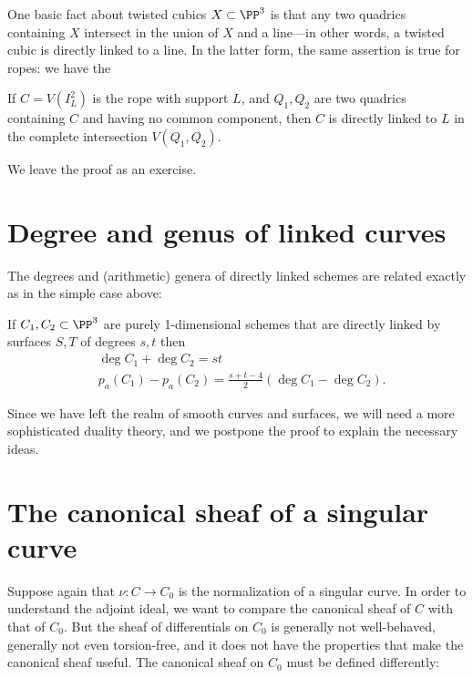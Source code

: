 One basic fact about twisted cubics $X \subset \PP^3$ is that any two quadrics containing $X$ intersect in the union of $X$ and a line---in other words, a twisted cubic is directly linked to a line. In the latter form, the same assertion is true for ropes: we have the

\begin{proposition}
If $C = V(I_L^2)$ is the rope with support $L$, and $Q_1, Q_2$ are two quadrics containing $C$ and having no common component, then $C$ is directly linked to $L$ in the complete intersection $V(Q_1,Q_2)$.
\end{proposition}

We leave the proof as an exercise.

\section{Degree and genus of linked curves}

The degrees and (arithmetic) genera 
of directly linked schemes are related exactly as in the simple case above:

\begin{theorem}\label{direct linkage}\label{linked genus formula}
If $C_1,{C_2}\subset \PP^3$ are purely 1-dimensional schemes that are directly linked by surfaces $S,T$ of degrees $s,t$  then 
$$
\begin{aligned}
&\deg C_1+\deg C_2 = st\\
&p_a(C_1) - p_a({C_2}) = \frac{s+t-4}{2}(\deg C_1-\deg {C_2}).
\end{aligned}
 $$
\end{theorem}

Since we have left the realm of smooth curves and surfaces, we will need a more sophisticated duality theory, and we
postpone the proof to explain the necessary ideas.


\section{The canonical sheaf of a singular curve}


Suppose again that $\nu:C\to C_0$ is the normalization of a singular curve. In order to understand the adjoint ideal, we 
want to compare the canonical sheaf of $C$ with
that of $C_0$. But the sheaf of differentials on $C_0$ is generally not well-behaved, generally not even torsion-free,
 and it does not
have the properties that make the canonical sheaf useful. The canonical
sheaf on $C_0$ must be defined differently:

